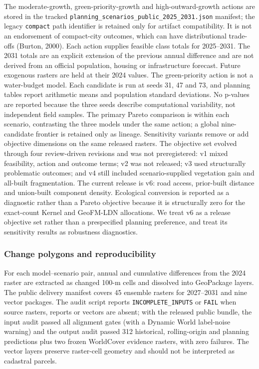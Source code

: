 \documentclass[
]{article}
\begin{document}
The moderate-growth, green-priority-growth and high-outward-growth
actions are stored in the tracked
\texttt{planning\_scenarios\_public\_2025\_2031.json} manifest; the
legacy \texttt{compact} path identifier is retained only for artifact
compatibility. It is not an endorsement of compact-city outcomes, which
can have distributional trade-offs (Burton, 2000). Each action supplies
feasible class totals for 2025--2031. The 2031 totals are an explicit
extension of the previous annual difference and are not derived from an
official population, housing or infrastructure forecast. Future
exogenous rasters are held at their 2024 values. The green-priority
action is not a water-budget model. Each candidate is run at seeds 31,
47 and 73, and planning tables report arithmetic means and population
standard deviations. No p-values are reported because the three seeds
describe computational variability, not independent field samples. The
primary Pareto comparison is within each scenario, contrasting the three
models under the same action; a global nine-candidate frontier is
retained only as lineage. Sensitivity variants remove or add objective
dimensions on the same released rasters. The objective set evolved
through four review-driven revisions and was not preregistered: v1 mixed
feasibility, action and outcome terms; v2 was not released; v3 used
structurally problematic outcomes; and v4 still included
scenario-supplied vegetation gain and all-built fragmentation. The
current release is v6: road access, prior-built distance and union-built
component density. Ecological conversion is reported as a diagnostic
rather than a Pareto objective because it is structurally zero for the
exact-count Kernel and GeoFM-LDN allocations. We treat v6 as a release
objective set rather than a prespecified planning preference, and treat
its sensitivity results as robustness diagnostics.

\subsubsection{Change polygons and
reproducibility}\label{change-polygons-and-reproducibility}

For each model--scenario pair, annual and cumulative differences from
the 2024 raster are extracted as changed 100-m cells and dissolved into
GeoPackage layers. The public delivery manifest covers 45 ensemble
rasters for 2027--2031 and nine vector packages. The audit script
reports \texttt{INCOMPLETE\_INPUTS} or \texttt{FAIL} when source
rasters, reports or vectors are absent; with the released public bundle,
the input audit passed all alignment gates (with a Dynamic World
label-noise warning) and the output audit passed 312 historical,
rolling-origin and planning predictions plus two frozen WorldCover
evidence rasters, with zero failures. The vector layers preserve
raster-cell geometry and should not be interpreted as cadastral parcels.
\end{document}

